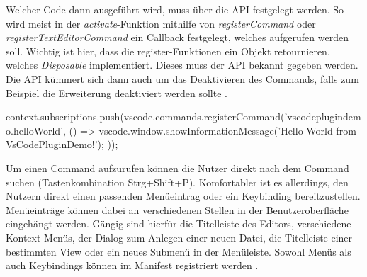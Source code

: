   Welcher Code dann ausgeführt wird, muss über die API festgelegt werden. So wird meist
  in der \emph{activate}-Funktion mithilfe von \emph{registerCommand} oder \emph{registerTextEditorCommand}
  ein Callback festgelegt, welches aufgerufen werden soll. Wichtig ist hier, dass
  die register-Funktionen ein Objekt retournieren, welches \emph{Disposable} implementiert.
  Dieses muss der API bekannt gegeben werden. 
  Die API kümmert sich dann auch um das Deaktivieren des Commands, falls zum Beispiel
  die Erweiterung deaktiviert werden sollte \cite{VSCodeExtensionAPICommands}.
\begin{JsCode}
    context.subscriptions.push(vscode.commands.registerCommand('vscodeplugindemo.helloWorld', () => {
      vscode.window.showInformationMessage('Hello World from VsCodePluginDemo!');
    })); 
\end{JsCode}

  Um einen Command aufzurufen können die Nutzer direkt nach dem Command suchen (Tastenkombination Strg+Shift+P).
  Komfortabler ist es allerdings, den Nutzern direkt einen passenden Menüeintrag oder ein Keybinding
  bereitzustellen. Menüeinträge können dabei an verschiedenen Stellen in der
  Benutzeroberfläche eingehängt werden.
  Gängig sind hierfür die Titelleiste des Editors, verschiedene Kontext-Menüs, der Dialog
  zum Anlegen einer neuen Datei, die Titelleiste einer bestimmten View oder ein neues Submenü in der Menüleiste.
  Sowohl Menüs als auch Keybindings können im Manifest registriert werden
  \cite{VSCodeExtensionAPIContributionPointsMenus}.
